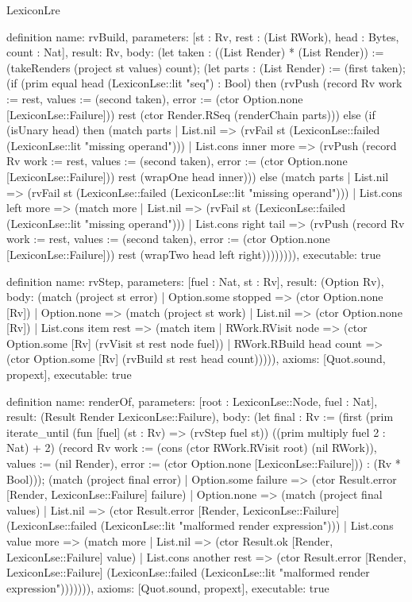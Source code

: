 \begin{lexlean}{LexiconLre}
\begin{semanticmodule}
definition{
  name: rvBuild,
  parameters: [st : Rv, rest : (List RWork), head : Bytes, count : Nat],
  result: Rv,
  body: (let taken : ((List Render) * (List Render)) := (takeRenders (project st values) count); (let parts : (List Render) := (first taken); (if (prim equal head (LexiconLse::lit "seq") : Bool) then (rvPush (record Rv {work := rest, values := (second taken), error := (ctor Option.none [LexiconLse::Failure])}) rest (ctor Render.RSeq (renderChain parts))) else (if (isUnary head) then (match parts
    | List.nil => (rvFail st (LexiconLse::failed (LexiconLse::lit "missing operand")))
    | List.cons inner more => (rvPush (record Rv {work := rest, values := (second taken), error := (ctor Option.none [LexiconLse::Failure])}) rest (wrapOne head inner))) else (match parts
    | List.nil => (rvFail st (LexiconLse::failed (LexiconLse::lit "missing operand")))
    | List.cons left more => (match more
      | List.nil => (rvFail st (LexiconLse::failed (LexiconLse::lit "missing operand")))
      | List.cons right tail => (rvPush (record Rv {work := rest, values := (second taken), error := (ctor Option.none [LexiconLse::Failure])}) rest (wrapTwo head left right)))))))),
  executable: true
}

definition{
  name: rvStep,
  parameters: [fuel : Nat, st : Rv],
  result: (Option Rv),
  body: (match (project st error)
    | Option.some stopped => (ctor Option.none [Rv])
    | Option.none => (match (project st work)
      | List.nil => (ctor Option.none [Rv])
      | List.cons item rest => (match item
        | RWork.RVisit node => (ctor Option.some [Rv] (rvVisit st rest node fuel))
        | RWork.RBuild head count => (ctor Option.some [Rv] (rvBuild st rest head count))))),
  axioms: [Quot.sound, propext],
  executable: true
}

definition{
  name: renderOf,
  parameters: [root : LexiconLse::Node, fuel : Nat],
  result: (Result Render LexiconLse::Failure),
  body: (let final : Rv := (first (prim iterate_until (fun [fuel] (st : Rv) => (rvStep fuel st)) ((prim multiply fuel 2 : Nat) + 2) (record Rv {work := (cons (ctor RWork.RVisit root) (nil RWork)), values := (nil Render), error := (ctor Option.none [LexiconLse::Failure])}) : (Rv * Bool))); (match (project final error)
    | Option.some failure => (ctor Result.error [Render, LexiconLse::Failure] failure)
    | Option.none => (match (project final values)
      | List.nil => (ctor Result.error [Render, LexiconLse::Failure] (LexiconLse::failed (LexiconLse::lit "malformed render expression")))
      | List.cons value more => (match more
        | List.nil => (ctor Result.ok [Render, LexiconLse::Failure] value)
        | List.cons another rest => (ctor Result.error [Render, LexiconLse::Failure] (LexiconLse::failed (LexiconLse::lit "malformed render expression"))))))),
  axioms: [Quot.sound, propext],
  executable: true
}


\end{semanticmodule}
\end{lexlean}
